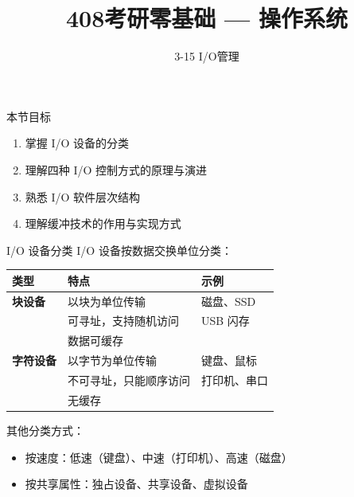 \documentclass[10pt, aspectratio=169]{beamer}
\title{408考研零基础 --- 操作系统}
\subtitle{3-15 I/O管理}
\author{}
\date{}
\begin{document}
\begin{frame}{本节目标}
    \begin{enumerate}
        \item 掌握 I/O 设备的分类
        \item 理解四种 I/O 控制方式的原理与演进
        \item 熟悉 I/O 软件层次结构
        \item 理解缓冲技术的作用与实现方式
    \end{enumerate}
\end{frame}

\begin{frame}{I/O 设备分类}
    I/O 设备按数据交换单位分类：
    \vspace{0.5em}
    \begin{center}
        \begin{tabular}{|l|l|l|}
            \hline
            \textbf{类型} & \textbf{特点} & \textbf{示例} \\
            \hline
            \textbf{块设备} & 以块为单位传输 & 磁盘、SSD \\
            & 可寻址，支持随机访问 & USB 闪存 \\
            & 数据可缓存 & \\
            \hline
            \textbf{字符设备} & 以字节为单位传输 & 键盘、鼠标 \\
            & 不可寻址，只能顺序访问 & 打印机、串口 \\
            & 无缓存 & \\
            \hline
        \end{tabular}
    \end{center}
    \vspace{0.5em}
    其他分类方式：
    \begin{itemize}
        \item 按速度：低速（键盘）、中速（打印机）、高速（磁盘）
        \item 按共享属性：独占设备、共享设备、虚拟设备
    \end{itemize}
\end{frame}
\end{document}

